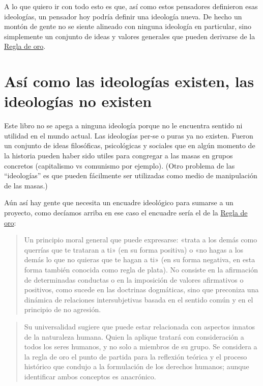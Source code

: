\documentclass[
]{book}
\begin{document}
A lo que quiero ir con todo esto es que, así como estos pensadores definieron esas ideologías, un pensador hoy podría definir una ideología nueva. De hecho un montón de gente no se siente alineado con ninguna ideología en particular, sino simplemente un conjunto de ideas y valores generales que pueden derivarse de la \href{https://es.wikipedia.org/wiki/Regla_de_oro_(\%C3\%A9tica)}{Regla de oro}.

\hypertarget{asuxed-como-las-ideologuxedas-existen-las-ideologuxedas-no-existen}{%
\section{Así como las ideologías existen, las ideologías no existen}\label{asuxed-como-las-ideologuxedas-existen-las-ideologuxedas-no-existen}}

Este libro no se apega a ninguna ideología porque no le encuentra sentido ni utilidad en el mundo actual. Las ideologías per-se o puras ya no existen. Fueron un conjunto de ideas filosóficas, psicológicas y sociales que en algún momento de la historia pueden haber sido utiles para congregar a las masas en grupos concretos (capitalismo vs comunismo por ejemplo). (Otro problema de las ``ideologías'' es que pueden fácilmente ser utilizadas como medio de manipulación de las masas.)

Aún así hay gente que necesita un encuadre ideológico para sumarse a un proyecto, como decíamos arriba en ese caso el encuadre sería el de la \href{https://es.wikipedia.org/wiki/Regla_de_oro_(\%C3\%A9tica)}{Regla de oro}:

\begin{quote}
Un principio moral general que puede expresarse: «trata a los demás como querrías que te trataran a ti» (en su forma positiva) o «no hagas a los demás lo que no quieras que te hagan a ti» (en su forma negativa, en esta forma también conocida como regla de plata). No consiste en la afirmación de determinadas conductas o en la imposición de valores afirmativos o positivos, como sucede en las doctrinas dogmáticas, sino que preconiza una dinámica de relaciones intersubjetivas basada en el sentido común y en el principio de no agresión.
\end{quote}

\begin{quote}
Su universalidad sugiere que puede estar relacionada con aspectos innatos de la naturaleza humana. Quien la aplique tratará con consideración a todos los seres humanos, y no solo a miembros de su grupo. Se considera a la regla de oro el punto de partida para la reflexión teórica y el proceso histórico que condujo a la formulación de los derechos humanos; aunque identificar ambos conceptos es anacrónico.
\end{quote}
\end{document}

